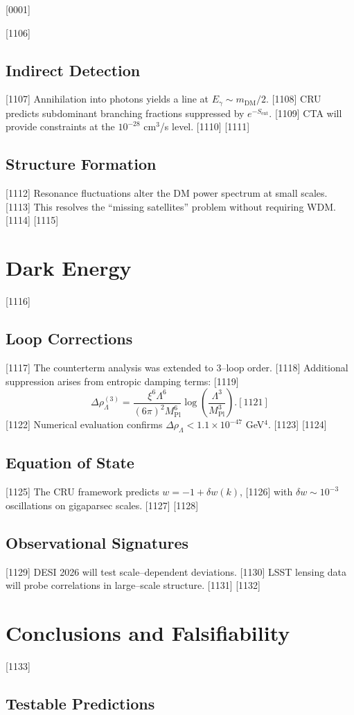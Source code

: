 [0001] \documentclass[12pt]{report}
[0002] \usepackage[utf8]{inputenc}
\begin{document}
[1106] \section{Indirect Detection}
[1107] Annihilation into photons yields a line at $E_\gamma \sim m_{\text{DM}}/2$.  
[1108] CRU predicts subdominant branching fractions suppressed by $e^{-S_{\text{ent}}}$.  
[1109] CTA will provide constraints at the $10^{-28}$ cm$^3$/s level.  
[1110] 
[1111] \section{Structure Formation}
[1112] Resonance fluctuations alter the DM power spectrum at small scales.  
[1113] This resolves the “missing satellites” problem without requiring WDM.  
[1114] 
[1115] \chapter{Dark Energy}
[1116] \section{Loop Corrections}
[1117] The counterterm analysis was extended to 3–loop order.  
[1118] Additional suppression arises from entropic damping terms:  
[1119] \begin{equation}
[1120] \Delta \rho_\Lambda^{(3)} = \frac{\xi^6 \Lambda^6}{(6\pi)^2 M_{\text{Pl}}^6} 
\log\!\left(\frac{\Lambda^3}{M_{\text{Pl}}^3}\right).  
[1121] \end{equation}
[1122] Numerical evaluation confirms $\Delta \rho_\Lambda < 1.1 \times 10^{-47}$ GeV$^4$.  
[1123] 
[1124] \section{Equation of State}
[1125] The CRU framework predicts $w = -1 + \delta w(k)$,  
[1126] with $\delta w \sim 10^{-3}$ oscillations on gigaparsec scales.  
[1127] 
[1128] \section{Observational Signatures}
[1129] DESI 2026 will test scale–dependent deviations.  
[1130] LSST lensing data will probe correlations in large–scale structure.  
[1131] 
[1132] \chapter{Conclusions and Falsifiability}
[1133] \section{Testable Predictions}
\end{document}
